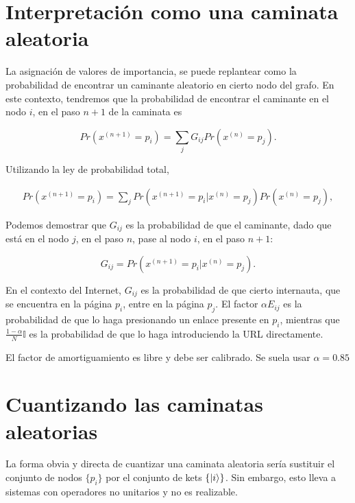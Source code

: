 \section{Interpretación como una caminata aleatoria}

La asignación de valores de importancia, se puede replantear como la probabilidad de encontrar un caminante aleatorio en cierto nodo del grafo. En este contexto, tendremos que la probabilidad de encontrar el caminante en el nodo $i$, en el paso $n+1$ de la caminata es

\begin{equation}
    Pr(x^{(n+1)}=p_i) = \sum\limits_j G_{i j} Pr(x^{(n)}=p_j) .
\end{equation}

Utilizando la ley de probabilidad total,

\begin{align}
    Pr(x^{(n+1)}=p_i) = \sum\limits_j Pr(x^{(n+1)}=p_i|x^{(n)}=p_j) Pr(x^{(n)}=p_j) ,
\end{align}

Podemos demostrar que $G_{i j}$ es la probabilidad de que el caminante, dado que está en el nodo $j$, en el paso $n$, pase al nodo $i$, en el paso $n+1$:

\begin{equation}
    G_{i j} = Pr(x^{(n+1)}=p_i | x^{(n)}=p_j) .
\end{equation}

En el contexto del Internet, $G_{i j}$ es la probabilidad de que cierto internauta, que se encuentra en la página $p_i$, entre en la página $p_j$. El factor $\alpha E_{i j}$ es la probabilidad de que lo haga presionando un enlace presente en $p_i$, mientras que $\frac{1-\alpha}{N} \mathds{I}$ es la probabilidad de que lo haga introduciendo la URL directamente.

El factor de amortiguamiento es libre y debe ser calibrado. Se suela usar $\alpha = 0.85$ \cite{Paparo_2012}

\section{Cuantizando las caminatas aleatorias}

La forma obvia y directa de cuantizar una caminata aleatoria sería sustituir el conjunto de nodos $\{p_i\}$ por el conjunto de kets $\{\ket{i}\}$. Sin embargo, esto lleva a sistemas con operadores no unitarios y no es realizable.

